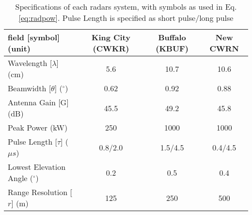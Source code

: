 \begin{table}[h]
    \caption{Specifications of each radars system, with symbols as used in Eq. \ref{eq:radpow}. Pulse Length is specified as short pulse/long pulse}\label{radarspecs}
    \begin{center}
    \begin{tabular}{|l|c|c|c|}
    \hline
     field [symbol](unit) & King City (CWKR) & Buffalo (KBUF) & New CWRN \\
    \hline\hline
    Wavelength [$\lambda$](cm) & 5.6  & 10.7 & 10.6\\
    \hline
    Beamwidth [$\theta$] ($^\circ$)  & 0.62  & 0.92 & 0.88 \\
    \hline
     Antenna Gain [G] (dB) & 45.5 & 49.2 & 45.8\\
    \hline
     Peak Power (kW) & 250 & 1000 & 1000 \\
    \hline
     Pulse Length [$\tau$] ($\mu s$) &  0.8/2.0 & 1.5/4.5 & 0.4/4.5 \\
    \hline
     Lowest Elevation Angle ($^\circ$) & 0.2 & 0.5 & 0.4 \\
    \hline
     Range Resolution [$r$] (m)& 125 & 250 & 500 \\
    \hline
    \end{tabular}
    \end{center}
\end{table}


